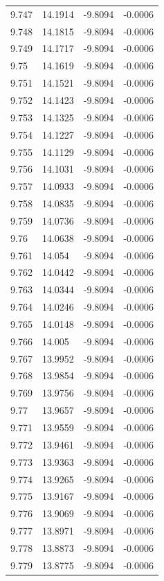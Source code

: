 \begin{tabular}{llll}
9.747 & 14.1914 & -9.8094 & -0.0006 \\
9.748 & 14.1815 & -9.8094 & -0.0006 \\
9.749 & 14.1717 & -9.8094 & -0.0006 \\
9.75 & 14.1619 & -9.8094 & -0.0006 \\
9.751 & 14.1521 & -9.8094 & -0.0006 \\
9.752 & 14.1423 & -9.8094 & -0.0006 \\
9.753 & 14.1325 & -9.8094 & -0.0006 \\
9.754 & 14.1227 & -9.8094 & -0.0006 \\
9.755 & 14.1129 & -9.8094 & -0.0006 \\
9.756 & 14.1031 & -9.8094 & -0.0006 \\
9.757 & 14.0933 & -9.8094 & -0.0006 \\
9.758 & 14.0835 & -9.8094 & -0.0006 \\
9.759 & 14.0736 & -9.8094 & -0.0006 \\
9.76 & 14.0638 & -9.8094 & -0.0006 \\
9.761 & 14.054 & -9.8094 & -0.0006 \\
9.762 & 14.0442 & -9.8094 & -0.0006 \\
9.763 & 14.0344 & -9.8094 & -0.0006 \\
9.764 & 14.0246 & -9.8094 & -0.0006 \\
9.765 & 14.0148 & -9.8094 & -0.0006 \\
9.766 & 14.005 & -9.8094 & -0.0006 \\
9.767 & 13.9952 & -9.8094 & -0.0006 \\
9.768 & 13.9854 & -9.8094 & -0.0006 \\
9.769 & 13.9756 & -9.8094 & -0.0006 \\
9.77 & 13.9657 & -9.8094 & -0.0006 \\
9.771 & 13.9559 & -9.8094 & -0.0006 \\
9.772 & 13.9461 & -9.8094 & -0.0006 \\
9.773 & 13.9363 & -9.8094 & -0.0006 \\
9.774 & 13.9265 & -9.8094 & -0.0006 \\
9.775 & 13.9167 & -9.8094 & -0.0006 \\
9.776 & 13.9069 & -9.8094 & -0.0006 \\
9.777 & 13.8971 & -9.8094 & -0.0006 \\
9.778 & 13.8873 & -9.8094 & -0.0006 \\
9.779 & 13.8775 & -9.8094 & -0.0006 \\

\end{tabular}
